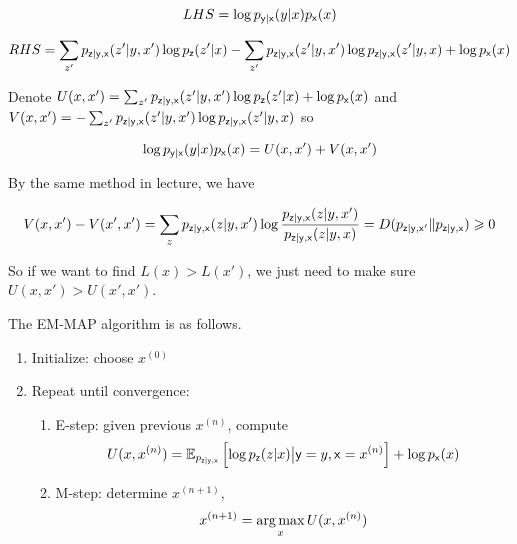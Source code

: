 \documentclass[a4paper]{article}
\begin{document}
\begin{enumerate}
  \begin{equation}
    LHS =  \log {p_{\mathsf{y}|\mathsf{x}} (y|x) p_{\mathsf{x}}(x)} 
  \end{equation}

  \begin{equation}
    \begin{aligned}
      RHS = \sum_{z'} p_{\mathsf{z} | \mathsf{y},\mathsf{x}} (z'|y,x') \log p_{\mathsf{z}}(z'|x) - \sum_{z'} p_{\mathsf{z} | \mathsf{y},\mathsf{x}} (z'|y,x') \log p_{\mathsf{z} | \mathsf{y},\mathsf{x}} (z'|y,x) + \log p_{\mathsf{x}}(x) 
    \end{aligned}
  \end{equation}

  Denote $U(x,x') =  \sum_{z'} p_{\mathsf{z} | \mathsf{y},\mathsf{x}} (z'|y,x') \log p_{\mathsf{z}}(z'|x)+ \log p_{\mathsf{x}}(x)$ and $V(x,x') = - \sum_{z'} p_{\mathsf{z} | \mathsf{y},\mathsf{x}} (z'|y,x') \log p_{\mathsf{z} | \mathsf{y},\mathsf{x}} (z'|y,x)$ so 

  \begin{equation}
    \log {p_{\mathsf{y}|\mathsf{x}} (y|x) p_{\mathsf{x}}(x)}  = U(x,x') + V(x,x')
  \end{equation} 

  By the same method in lecture, we have 

  \begin{equation}
    V(x,x') - V(x',x') = \sum_{z} p_{\mathsf{z} | \mathsf{y},\mathsf{x}} (z|y,x') \log \frac{p_{\mathsf{z} | \mathsf{y},\mathsf{x}} (z|y,x')}{p_{\mathsf{z} | \mathsf{y},\mathsf{x}} (z|y,x)} = D(p_{\mathsf{z} | \mathsf{y},\mathsf{x}'} \| p_{\mathsf{z} | \mathsf{y},\mathsf{x}}) \geqslant 0
  \end{equation}  

  So if we want to find $L(x)  > L(x')$, we just need to make sure $U(x,x') > U(x',x')$.

  The EM-MAP algorithm is as follows.

  \begin{enumerate}
    \item Initialize: choose $x^{(0)}$
    \item Repeat until convergence:\begin{enumerate}
      \item E-step: given previous $x^{(n)}$, compute \begin{equation}
        U(x,x^{(n)}) = \operatorname{\mathbb{E}}_{p_{\mathsf{z}|\mathsf{y},\mathsf{x}}}\left[\log p_{\mathsf{z}}(z|x) \big| \mathsf{y} = y, \mathsf{x}  = x^{(n) }\right] + \log p_{\mathsf{x}}(x)
      \end{equation}
      \item M-step: determine $x^{(n+1)}$, \begin{equation}
        x^{(n+1)} = \operatorname*{arg\,max}_{x} U(x,x^{(n)})
      \end{equation}
    \end{enumerate}
  \end{enumerate}

  \end{enumerate}
\end{document}
